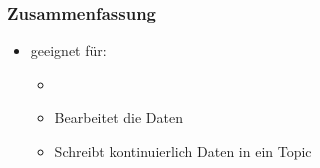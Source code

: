 \begin{frame}
\frametitle{Zusammenfassung}

\begin{itemize}
	\item geeignet für:
	\begin{itemize}
		\item   %
		\item Bearbeitet die Daten %
		\item Schreibt kontinuierlich Daten in ein Topic %
	\end{itemize}
\end{itemize}

\end{frame}



